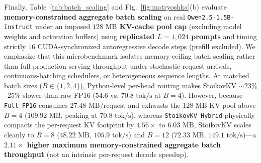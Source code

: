 \documentclass[conference]{IEEEtran}
\begin{document}
Finally, Table~\ref{tab:batch_scaling} and Fig.~\ref{fig:matryoshka}(b) evaluate \textbf{memory-constrained aggregate batch scaling} on real \texttt{Qwen2.5-1.5B-Instruct} under an imposed \textbf{$128\text{ MB}$ KV-cache pool cap} (excluding model weights and activation buffers) using \textbf{replicated $L = 1{,}024$ prompts} and timing strictly $16$ CUDA-synchronized autoregressive decode steps (prefill excluded). We emphasize that this microbenchmark isolates memory-ceiling batch scaling rather than full production serving throughput under stochastic request arrivals, continuous-batching schedulers, or heterogeneous sequence lengths. At matched batch sizes ($B \in \{1, 2, 4\}$), Python-level per-head routing makes StoikovKV $\sim 23\%$--$25\%$ slower than raw FP16 ($54.6$ vs. $70.8\text{ tok/s}$ at $B=4$). However, because \texttt{Full FP16} consumes $27.48\text{ MB/request}$ and exhausts the $128\text{ MB}$ KV pool above $B=4$ ($109.92\text{ MB}$, peaking at $70.8\text{ tok/s}$), whereas \texttt{StoikovKV Hybrid} physically compacts the per-request KV footprint by $4.56\times$ to $6.03\text{ MB}$, StoikovKV scales cleanly to $B=8$ ($48.22\text{ MB}$, $105.9\text{ tok/s}$) and $B=12$ ($72.33\text{ MB}$, \textbf{$149.1\text{ tok/s}$})---a \textbf{$2.11\times$ higher maximum memory-constrained aggregate batch throughput} (not an intrinsic per-request decode speedup).

\begin{table}[t]
\caption{Memory-Constrained Aggregate Batch Scaling on Real \texttt{Qwen2.5-1.5B-Instruct} (Imposed $128\text{ MB}$ KV Pool, Replicated $L=1{,}024$ Prompts, 16 Synchronized Decode Steps)}
\begin{center}
\label{tab:batch_scaling}
\end{center}
\end{table}
\end{document}
